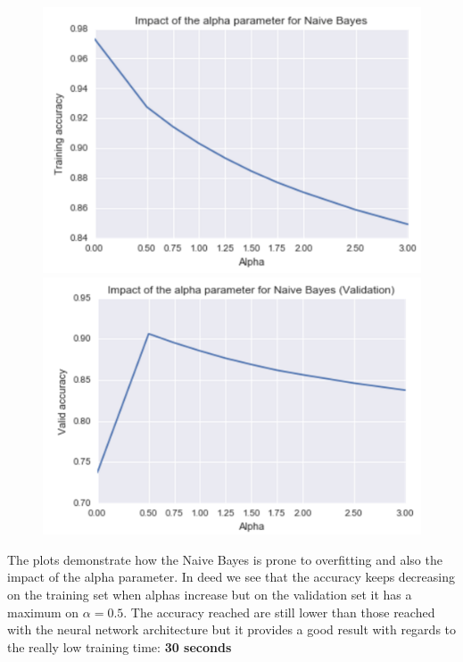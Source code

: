 \documentclass[11pt]{article}
\begin{document}
\begin{figure}[H]
\centering
\begin{minipage}{.4\textwidth}
  \centering
  \includegraphics[width=1.2\linewidth]{training_nb}
\end{minipage} 
\hfill
\begin{minipage}{.4\textwidth}
  \centering
  \includegraphics[width=1.2\linewidth]{validation_nb}
\end{minipage}
\end{figure}

The plots demonstrate how the Naive Bayes is prone to overfitting and also the impact of the alpha parameter. In deed we see that the accuracy keeps decreasing on the training set when alphas increase but on the validation set it has a maximum on $\alpha = 0.5$. The accuracy reached are still lower than those reached with the neural network architecture but it provides a good result with regards to the really low training time: \textbf{30 seconds}
\end{document}
